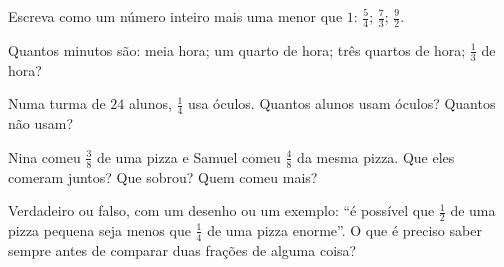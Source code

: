 \begin{exercise}[$\star$]\label{exo:g4:fractions:7}
Escreva como um número inteiro mais uma  menor que $1$:
$\frac54$; \quad $\frac73$; \quad $\frac{9}{2}$.
\end{exercise}

\begin{exercise}[$\star$]\label{exo:g4:fractions:8}
Quantos minutos são: meia hora; um quarto de hora; três quartos de
hora; $\frac13$ de hora?
\end{exercise}

\begin{exercise}[$\star$]\label{exo:g4:fractions:9}
Numa turma de $24$ alunos, $\frac14$ usa óculos. Quantos alunos usam
óculos? Quantos não usam?
\end{exercise}

\begin{exercise}[$\star\star$]\label{exo:g4:fractions:10}
Nina comeu $\frac38$ de uma pizza e Samuel comeu $\frac48$ da mesma
pizza. Que  eles comeram juntos? Que  sobrou? Quem comeu
mais?
\end{exercise}

\begin{exercise}[$\star\star$]\label{exo:g4:fractions:11}
Verdadeiro ou falso, com um desenho ou um exemplo: ``é possível que
$\frac12$ de uma pizza pequena seja menos que $\frac14$ de uma pizza
enorme''. O que é preciso saber sempre antes de comparar duas frações
de alguma coisa?
\end{exercise}
